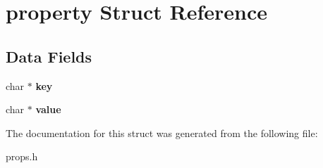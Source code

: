 \hypertarget{structproperty}{}\section{property Struct Reference}
\label{structproperty}
\subsection*{Data Fields}
\begin{DoxyCompactItemize}
\item 
\hypertarget{structproperty_afc4ec65a071961b18d4af582570c650f}{}char $\ast$ {\bfseries key}\label{structproperty_afc4ec65a071961b18d4af582570c650f}

\item 
\hypertarget{structproperty_ac9d69192518bfec796e14df2d56e18c9}{}char $\ast$ {\bfseries value}\label{structproperty_ac9d69192518bfec796e14df2d56e18c9}

\end{DoxyCompactItemize}


The documentation for this struct was generated from the following file\+:\begin{DoxyCompactItemize}
\item 
props.\+h\end{DoxyCompactItemize}
